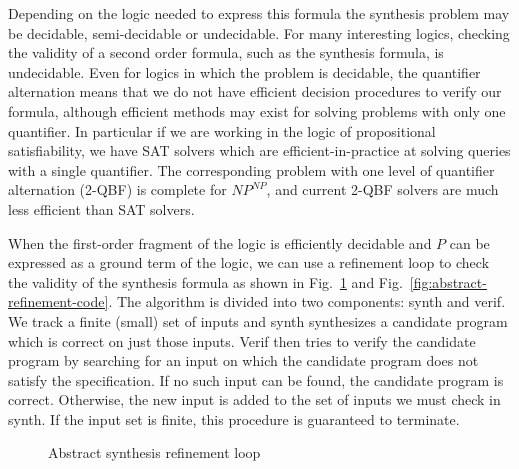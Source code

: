 \documentclass[a4paper]{llncs}
\begin{document}
Depending on the logic needed to express this formula the synthesis problem may
be decidable, semi-decidable or undecidable.  For many interesting logics, checking
the validity of a second order formula, such as the synthesis formula, is undecidable.
Even for logics in which the problem is decidable, the quantifier alternation means that
we do not have efficient decision procedures to verify our formula, although efficient
methods may exist for solving problems with only one quantifier.  In particular
if we are working in the logic of propositional satisfiability, we have SAT solvers
which are efficient-in-practice at solving queries with a single quantifier.
The corresponding problem with one level of quantifier alternation (2-QBF) is
complete for $NP^{NP}$, and current 2-QBF solvers are much less efficient than SAT solvers.

When the first-order fragment of the logic is efficiently decidable and $P$ can be
expressed as a ground term of the logic, we can use a refinement loop to check the
validity of the synthesis formula as shown in Fig.~\ref{fig:abstract-refinement} and
Fig.~\ref{fig:abstract-refinement-code}.  The algorithm is divided into two
components: {\sc synth} and {\sc verif}.  We track a finite (small) set of inputs
and {\sc synth} synthesizes a candidate program which is correct on just those inputs.
{\sc Verif} then tries to verify the candidate program by searching for an input on
which the candidate program does not satisfy the specification.  If no such input
can be found, the candidate program is correct.  Otherwise, the new input is added
to the set of inputs we must check in {\sc synth}.  If the input set is finite, this
procedure is guaranteed to terminate.

\begin{figure}
 \centering

 \label{fig:abstract-refinement}
 \caption{Abstract synthesis refinement loop}
\end{figure}
\end{document}
